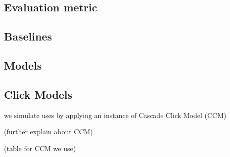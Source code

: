 \subsection{Evaluation metric}

\subsection{Baselines}


\subsection{Models}

\subsection{Click Models}
we simulate uses by applying an instance of Cascade Click Model (CCM)~\cite{}

(further explain about CCM)

(table for CCM we use)

